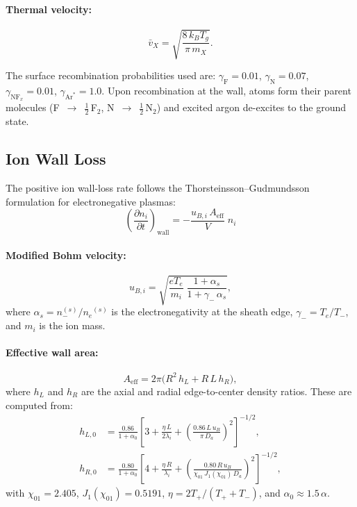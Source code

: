 \documentclass[11pt,a4paper]{article}
\newcommand{\ddt}[1]{\frac{\partial #1}{\partial t}}
\newcommand{\Te}{\ensuremath{T_e}}
\newcommand{\Tg}{\ensuremath{T_g}}
\renewcommand{\ne}{\ensuremath{n_e}}
\begin{document}
\paragraph{Thermal velocity:}
\begin{equation}
  \label{eq:vth}
  \bar{v}_X = \sqrt{\frac{8\,k_B\Tg}{\pi\,m_X}}.
\end{equation}

The surface recombination probabilities used are: $\gamma_\text{F} = 0.01$,
$\gamma_\text{N} = 0.07$, $\gamma_\text{NF}_x = 0.01$, $\gamma_{\text{Ar}^*}
= 1.0$. Upon recombination at the wall, atoms form their parent molecules
(F~$\to$~$\frac{1}{2}$\,F$_2$, N~$\to$~$\frac{1}{2}$\,N$_2$) and excited
argon de-excites to the ground state.


\subsection{Ion Wall Loss}
\label{sec:ion_wall}

The positive ion wall-loss rate follows the Thorsteinsson--Gudmundsson
formulation for electronegative plasmas:
\begin{equation}
  \label{eq:ion_wall}
  \boxed{
  \left(\ddt{n_i}\right)_{\!\text{wall}} = -\frac{u_{B,i}\,A_{\text{eff}}}{V}\;n_i
  }
\end{equation}

\paragraph{Modified Bohm velocity:}
\begin{equation}
  \label{eq:bohm}
  u_{B,i} = \sqrt{\frac{e\Te}{m_i}\;\frac{1+\alpha_s}{1+\gamma_-\,\alpha_s}},
\end{equation}
where $\alpha_s = n_-^{(s)}/\ne^{(s)}$ is the electronegativity at the sheath
edge, $\gamma_- = \Te/T_-$, and $m_i$ is the ion mass.

\paragraph{Effective wall area:}
\begin{equation}
  \label{eq:Aeff}
  A_{\text{eff}} = 2\pi\bigl(R^2\,h_L + R\,L\,h_R\bigr),
\end{equation}
where $h_L$ and $h_R$ are the axial and radial edge-to-center density ratios.
These are computed from:
\begin{align}
  h_{L,0} &= \frac{0.86}{1+\alpha_0}\left[
    3 + \frac{\eta\,L}{2\lambda_i}
    + \left(\frac{0.86\,L\,u_B}{\pi\,D_a}\right)^{\!2}
  \right]^{-1/2}, \label{eq:hL}\\[4pt]
  h_{R,0} &= \frac{0.80}{1+\alpha_0}\left[
    4 + \frac{\eta\,R}{\lambda_i}
    + \left(\frac{0.80\,R\,u_B}{\chi_{01}\,J_1(\chi_{01})\,D_a}\right)^{\!2}
  \right]^{-1/2}, \label{eq:hR}
\end{align}
with $\chi_{01} = 2.405$, $J_1(\chi_{01}) = 0.5191$, $\eta = 2T_+/(T_+ + T_-)$,
and $\alpha_0 \approx 1.5\,\alpha$.
\end{document}
